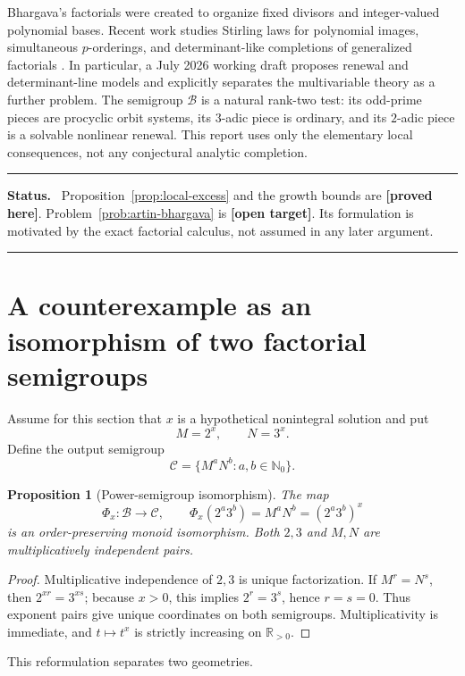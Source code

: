 \documentclass[11pt,oneside]{article}
\newtheorem{proposition}[theorem]{Proposition}
\theoremstyle{definition}
\theoremstyle{remark}
\newcommand{\Nzero}{\mathbb N_0}
\newcommand{\R}{\mathbb R}
\newcommand{\B}{\mathcal B}
\newcommand{\Cout}{\mathcal C}
\newcommand{\statusproved}{\textcolor{newgreen}{\textbf{[proved here]}}}
\newcommand{\statusopen}{\textcolor{openorange}{\textbf{[open target]}}}
\newenvironment{statusbox}
{\begin{center}\begin{minipage}{0.94\textwidth}\raggedright\hrule
\vspace{0.42em}\textbf{Status.}\ }
{\par\vspace{0.32em}\hrule\end{minipage}\end{center}}
\begin{document}
Bhargava's factorials were created to organize fixed divisors and integer-valued polynomial
bases.  Recent work studies Stirling laws for polynomial images, simultaneous \(p\)-orderings,
and determinant-like completions of generalized factorials
\cite{Takeda2023,Szumowicz2023,Diaz2026}.  In particular, a July 2026
working draft proposes renewal and determinant-line models and explicitly separates the
multivariable theory as a further problem.  The semigroup \(\B\) is a natural rank-two test:
its odd-prime pieces are procyclic orbit systems, its \(3\)-adic piece is ordinary, and its
\(2\)-adic piece is a solvable nonlinear renewal.  This report uses only the elementary local
consequences, not any conjectural analytic completion.

\begin{statusbox}
Proposition~\ref{prop:local-excess} and the growth bounds are \statusproved.
Problem~\ref{prob:artin-bhargava} is \statusopen.  Its formulation is motivated by the exact
factorial calculus, not assumed in any later argument.
\end{statusbox}

\section{A counterexample as an isomorphism of two factorial semigroups}
\label{sec:two-semigroups}

Assume for this section that \(x\) is a hypothetical nonintegral solution and put
\[
 M=2^x,\qquad N=3^x.
\]
Define the output semigroup
\[
 \Cout=\{M^aN^b:a,b\in\Nzero\}.
\]

\begin{proposition}[Power-semigroup isomorphism]
\label{prop:semigroup-isomorphism}
The map
\[
 \Phi_x:\B\longrightarrow\Cout,\qquad
 \Phi_x(2^a3^b)=M^aN^b=(2^a3^b)^x
\]
is an order-preserving monoid isomorphism.  Both \(2,3\) and \(M,N\) are multiplicatively
independent pairs.
\end{proposition}

\begin{proof}
Multiplicative independence of \(2,3\) is unique factorization.  If \(M^r=N^s\), then
\(2^{xr}=3^{xs}\); because \(x>0\), this implies \(2^r=3^s\), hence \(r=s=0\).
Thus exponent pairs give unique coordinates on both semigroups.  Multiplicativity is immediate,
and \(t\mapsto t^x\) is strictly increasing on \(\R_{>0}\).
\end{proof}

This reformulation separates two geometries.
\end{document}
